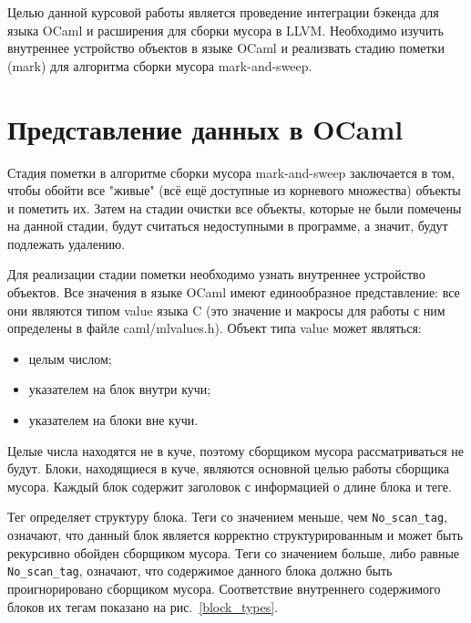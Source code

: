 Целью данной курсовой работы является проведение интеграции бэкенда для языка OCaml и расширения для сборки мусора в LLVM. Необходимо изучить внутреннее 
устройство объектов в языке OCaml и реализвать стадию пометки (mark) для алгоритма сборки мусора mark-and-sweep.

\section{Представление данных в OCaml}

Стадия пометки в алгоритме сборки мусора mark-and-sweep заключается в том, чтобы обойти все "живые" (всё ещё доступные из корневого множества)
объекты и пометить их. Затем на стадии очистки все объекты, которые не были помечены на данной стадии, будут считаться недоступными в программе, а значит,
будут подлежать удалению.

Для реализации стадии пометки необходимо узнать внутреннее устройство объектов.
Все значения в языке OCaml имеют единообразное представление: все они являются типом value языка C (это значение и макросы для работы с ним
определены в файле caml/mlvalues.h). Объект типа value может являться:

\begin{itemize}
   \item целым числом;
   \item указателем на блок внутри кучи;
   \item указателем на блоки вне кучи.
\end{itemize}

Целые числа находятся не в куче, поэтому сборщиком мусора рассматриваться не будут. Блоки, находящиеся в куче, являются основной целью работы сборщика
мусора. Каждый блок содержит заголовок с информацией о длине блока и теге.

Тег определяет структуру блока. Теги со значением меньше, чем \texttt{No\_scan\_tag}, 
означают, что данный блок является корректно структурированным и может быть рекурсивно обойден сборщиком мусора. 
Теги со значением больше, либо равные \texttt{No\_scan\_tag}, означают, что содержимое данного блока должно быть проигнорировано сборщиком мусора. 
Соответствие внутреннего содержимого блоков их тегам показано на рис.~\ref{block_types}.

